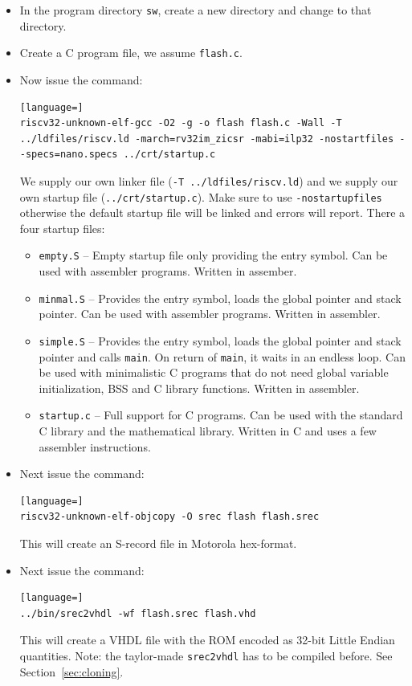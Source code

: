 \documentclass[12pt]{article}
\begin{document}
\begin{itemize}
\item In the program directory \lstinline|sw|, create a new directory and change to that directory.
\item Create a C program file, we assume \lstinline|flash.c|.
\item Now issue the command:
\begin{lstlisting}[language=]
riscv32-unknown-elf-gcc -O2 -g -o flash flash.c -Wall -T ../ldfiles/riscv.ld -march=rv32im_zicsr -mabi=ilp32 -nostartfiles --specs=nano.specs ../crt/startup.c
\end{lstlisting}
We supply our own linker file (\lstinline|-T ../ldfiles/riscv.ld|) and we supply our own startup file (\lstinline|../crt/startup.c|). Make sure to use \lstinline|-nostartupfiles| otherwise the default startup file will be linked and errors will report. There a four startup files:
\begin{itemize}
\item \lstinline|empty.S| -- Empty startup file only providing the entry symbol. Can be used with assembler programs. Written in assember.
\item \lstinline|minmal.S| -- Provides the entry symbol, loads the global pointer and stack pointer. Can be used with assembler programs. Written in assembler.
\item \lstinline|simple.S| -- Provides the entry symbol, loads the global pointer and stack pointer and calls \lstinline|main|. On return of \lstinline|main|, it waits in an endless loop. Can be used with minimalistic C programs that do not need global variable initialization, BSS and C library functions. Written in assembler.
\item \lstinline|startup.c| -- Full support for C programs. Can be used with the standard C library and the mathematical library. Written in C and uses a few assembler instructions.
\end{itemize}
\item Next issue the command:
\begin{lstlisting}[language=]
riscv32-unknown-elf-objcopy -O srec flash flash.srec
\end{lstlisting}
This will create an S-record file in Motorola hex-format.
\item Next issue the command:
\begin{lstlisting}[language=]
../bin/srec2vhdl -wf flash.srec flash.vhd
\end{lstlisting}
This will create a VHDL file with the ROM encoded as 32-bit Little Endian quantities. Note: the taylor-made \lstinline|srec2vhdl| has to be compiled before. See Section~\ref{sec:cloning}.

\end{itemize}
\end{document}
